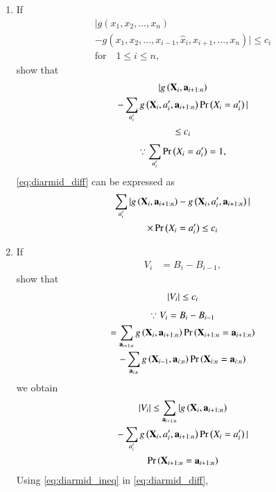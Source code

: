 \documentclass[journal,12pt,twocolumn]{IEEEtran}
\renewcommand\thesection{\arabic{section}}
\begin{document}
\begin{enumerate}[label=\thesection.\arabic*,ref=\thesection.\theenumi]
\item If
\begin{multline}
|g(x_{1},x_{2},\dots ,x_{n})
\\
-g(x_{1},x_{2},\dots ,x_{{i-1}},{\hat  x}_{i},x_{{i+1}},\dots ,x_{n})|\leq c_{i}
\\
 {\text{for}}\quad 1\leq i\leq n,
\end{multline}
%
show that
\begin{multline}
|g\left(\mathbf{X}_{i},\mathbf{a}_{i+1:n}\right)
\\
-\sum_{{a}_{i}^{\prime}}g\left(\mathbf{X}_{i},a_i^{\prime},\mathbf{a}_{i+1:n}\right)\Pr\left({X}_{i} = {a}_{i}^{\prime}\right)
|
\\
\le c_i
\label{eq:diarmid_ineq}
\end{multline}
\solution
\begin{align}
\because 
\sum_{{a}_{i}^{\prime}}\Pr\left({X}_{i} = {a}_{i}^{\prime}\right) = 1,
\end{align}
\eqref{eq:diarmid_diff} can be expressed as
\begin{multline}
\sum_{{a}_{i}^{\prime}}|g\left(\mathbf{X}_{i},\mathbf{a}_{i+1:n}\right)
-g\left(\mathbf{X}_{i},a_i^{\prime},\mathbf{a}_{i+1:n}\right)|
\\
\times \Pr\left({X}_{i} 
= {a}_{i}^{\prime}\right)
\le 
 c_i
\end{multline}
\item If
\begin{align}
V_i &=B_i - B_{i-1}, 
\end{align}
show that 
\begin{align}
\left\vert V_i\right\vert \le c_i
\end{align}
\solution
\begin{multline}
\because V_i =B_i - B_{i-1} 
\\
= 
\sum_{\mathbf{a}_{i+1:n}}g\left(\mathbf{X}_{i},\mathbf{a}_{i+1:n}\right)\Pr\left(\mathbf{X}_{i+1:n} = \mathbf{a}_{i+1:n}\right)
\\
- 
\sum_{\mathbf{a}_{i:n}}g\left(\mathbf{X}_{i-1},\mathbf{a}_{i:n}\right)\Pr\left(\mathbf{X}_{i:n} = \mathbf{a}_{i:n}\right)
\end{multline}
%
we obtain
\begin{multline}
\left\vert V_i\right\vert
\le 
\sum_{\mathbf{a}_{i+1:n}}|g\left(\mathbf{X}_{i},\mathbf{a}_{i+1:n}\right)
\\
-\sum_{{a}_{i}^{\prime}}g\left(\mathbf{X}_{i},a_i^{\prime},\mathbf{a}_{i+1:n}\right)\Pr\left({X}_{i} = {a}_{i}^{\prime}\right)
|
\\
\Pr\left(\mathbf{X}_{i+1:n} = \mathbf{a}_{i+1:n}\right)
\label{eq:diarmid_diff}
\end{multline}
Using \eqref{eq:diarmid_ineq} in \eqref{eq:diarmid_diff},


\end{enumerate}
\end{document}
